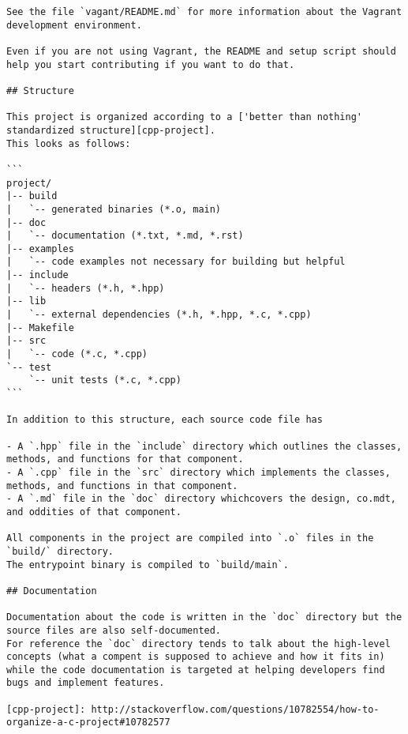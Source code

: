 \begin{lstlisting}
See the file `vagant/README.md` for more information about the Vagrant development environment.

Even if you are not using Vagrant, the README and setup script should help you start contributing if you want to do that.

## Structure

This project is organized according to a ['better than nothing' standardized structure][cpp-project].
This looks as follows:

```
project/
|-- build
|   `-- generated binaries (*.o, main)
|-- doc
|   `-- documentation (*.txt, *.md, *.rst)
|-- examples
|   `-- code examples not necessary for building but helpful
|-- include
|   `-- headers (*.h, *.hpp)
|-- lib
|   `-- external dependencies (*.h, *.hpp, *.c, *.cpp)
|-- Makefile
|-- src
|   `-- code (*.c, *.cpp)
`-- test
    `-- unit tests (*.c, *.cpp)
```

In addition to this structure, each source code file has

- A `.hpp` file in the `include` directory which outlines the classes, methods, and functions for that component.
- A `.cpp` file in the `src` directory which implements the classes, methods, and functions in that component.
- A `.md` file in the `doc` directory whichcovers the design, co.mdt, and oddities of that component.

All components in the project are compiled into `.o` files in the `build/` directory.
The entrypoint binary is compiled to `build/main`.

## Documentation

Documentation about the code is written in the `doc` directory but the source files are also self-documented.
For reference the `doc` directory tends to talk about the high-level concepts (what a compent is supposed to achieve and how it fits in) while the code documentation is targeted at helping developers find bugs and implement features.

[cpp-project]: http://stackoverflow.com/questions/10782554/how-to-organize-a-c-project#10782577
\end{lstlisting}

